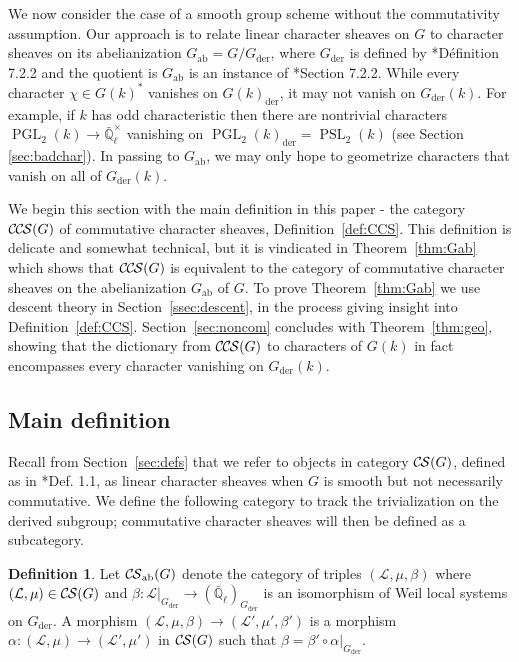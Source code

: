 \documentclass[10pt]{amsart}
\theoremstyle{plain}
\theoremstyle{definition}
\newtheorem{definition}[theorem]{Definition}
\newcommand{\EE}{\mathbb{\bar Q}_\ell}
\newcommand{\EEx}{\EE^\times}
\DeclareMathOperator{\PGL}{PGL}
\DeclareMathOperator{\PSL}{PSL}
\newcommand{\der}{_{\operatorname{der}}}
\newcommand{\ab}{_{\operatorname{ab}}}
\newcommand{\cs}[1]{{\mathcal{#1}}}
\newcommand{\CS}{{\mathcal{C\hskip-0.8pt S}}}
\newcommand{\CCS}{{\mathcal{C\hskip-.8pt C\hskip-0.8pt S}}}
\begin{document}
We now consider the case of a smooth group scheme without the commutativity assumption.  Our approach
is to relate linear character sheaves on $G$ to character sheaves on its abelianization $G\ab = G / G\der$, where $G\der$ is defined by \cite{demazure:SGA3-VIB}*{D\'efinition 7.2.2} and the quotient is $G\ab$ is an instance of  \cite{demazure:SGA3-VIA}*{Section 7.2.2}.
While every character $\chi \in G(k)^*$ vanishes on $G(k)\der$, it may not vanish on $G\der(k)$.  For example,
if $k$ has odd characteristic then there are nontrivial characters $\PGL_2(k) \to \EEx$ vanishing on
$\PGL_2(k)\der = \PSL_2(k)$ (see Section \ref{sec:badchar}).  In passing to $G\ab$,
we may only hope to geometrize characters that vanish on all of $G\der(k)$.

We begin this section with the main definition in this paper - the category $\CCS(G)$ of commutative character sheaves, Definition~\ref{def:CCS}. 
This definition is delicate and somewhat technical, but it is vindicated in Theorem~\ref{thm:Gab} which shows that $\CCS(G)$ is equivalent to the category of commutative character sheaves on the abelianization $G\ab$ of $G$. 
To prove Theorem~\ref{thm:Gab} we use descent theory in Section~\ref{ssec:descent}, in the process giving insight into Definition~\ref{def:CCS}. 
Section~\ref{sec:noncom} concludes with Theorem~\ref{thm:geo}, showing that the dictionary from $\CCS(G)$
to characters of $G(k)$ in fact encompasses every character vanishing on $G\der(k)$.

\subsection{Main definition}\label{ssec:noncomdef}

Recall from Section~\ref{sec:defs} that we refer to objects in category $\CS(G)$, defined as
in \cite{cunningham-roe:13a}*{Def. 1.1}, as linear character sheaves when $G$ is smooth but
not necessarily commutative.  
We define the following category to track the trivialization on the derived subgroup;
commutative character sheaves will then be defined as a subcategory.


\begin{definition}\label{def:CSab}
Let $\CS\ab(G)$ denote the category of triples $(\cs{L},\mu,\beta)$ where $(\cs{L},\mu) \in \CS(G)$ and
$\beta : \cs{L}\vert_{G\der} \to (\EE)_{G\der}$ is an isomorphism of Weil local systems on $G\der$.
A morphism $(\cs{L},\mu,\beta)\to (\cs{L}',\mu',\beta')$ is a morphism $\alpha : (\cs{L},\mu)\to (\cs{L}',\mu')$
in $\CS(G)$ such that $\beta = \beta' \circ \alpha\vert_{G\der}$.  
\end{definition}
\end{document}
